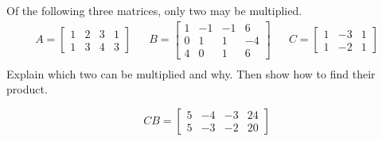 
\begin{exerciseStatement}


Of the following three matrices, only two may be multiplied. 
\begin{align*} A= \left[\begin{array}{cccc}
1 & 2 & 3 & 1 \\
1 & 3 & 4 & 3
\end{array}\right]  & & B= \left[\begin{array}{cccc}
1 & -1 & -1 & 6 \\
0 & 1 & 1 & -4 \\
4 & 0 & 1 & 6
\end{array}\right]  & & C= \left[\begin{array}{ccc}
1 & -3 & 1 \\
1 & -2 & 1
\end{array}\right]  \\ \end{align*}
             Explain which two can be multiplied and why. Then show how to find their product.


\end{exerciseStatement}
    
\begin{exerciseAnswer} 
\[CB= \left[\begin{array}{cccc}
5 & -4 & -3 & 24 \\
5 & -3 & -2 & 20
\end{array}\right] \]
\end{exerciseAnswer}
    
